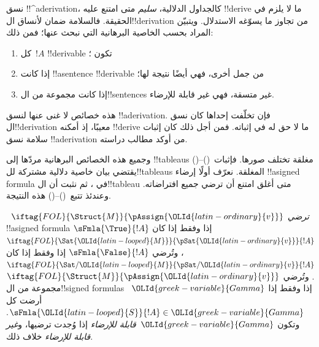 \documentclass[../../../include/open-logic-section]{subfiles}
\begin{document}
      {}
      {}
      

\begin{explain}
نسق !!^a{derivation}، كالجداول الدلالية، \emph{سليم} متى امتنع عليه
!!{derive} ما لا يلزم في الحقيقة. فالسلامة ضمان لأنساق ال!!{derivation}
من تجاوز ما يسوّغه الاستدلال. ويتبيّن المراد بحسب الخاصية البرهانية
التي نبحث عنها؛ فمن ذلك:
\begin{enumerate}
\item كل~$!A$ !!{derivable} تكون ؛
\item إذا كانت !!a{sentence} !!{derivable} من جمل أخرى، فهي أيضًا نتيجة لها؛
\item إذا كانت مجموعة من ال!!{sentence}s غير متسقة، فهي غير قابلة للإرضاء.
\end{enumerate}
هذه خصائص لا غنى عنها لنسق !!a{derivation}. فإن تخلّفت إحداها
كان نسق ال!!{derivation} معيبًا، إذ أمكنه !!{derive} ما لا حق له
في إثباته. فمن أجل ذلك كان إثبات سلامة نسق !!a{derivation}
من أوكد مطالب دراسته.

وجميع هذه الخصائص البرهانية مردّها إلى !!{tableau}s مغلقة
تختلف صورها. فإثبات~()--() يقتضي بيان خاصية دلالية مشتركة
لل!!{tableau}s المغلقة. نعرّف أولًا إرضاء
!!a{signed formula} في ، ثم نثبت أن
ال!!{tableau} متى أغلق امتنع أن ترضي 
جميع افتراضاته. وعندئذ تتبع~()--() هذه النتيجة.
\end{explain}

\begin{defn}
~$\iftag{FOL}{\Struct{M}}{\pAssign{{\OLId{latin-ordinary}{v}}}}$
\emph{ترضي}
!!a{signed formula} $\sFmla{\True}{!A}$ إذا وفقط إذا كان
$\iftag{FOL}{\Sat{{\OLId{latin-looped}{M}}}}{\pSat{{\OLId{latin-ordinary}{v}}}}{!A}$، وتُرضي
$\sFmla{\False}{!A}$ إذا وفقط إذا كان
$\iftag{FOL}{\Sat/{{\OLId{latin-looped}{M}}}}{\pSat/{{\OLId{latin-ordinary}{v}}}}{!A}$. وتُرضي
$\iftag{FOL}{\Struct{M}}{\pAssign{{\OLId{latin-ordinary}{v}}}}$ مجموعة من ال!!{signed formula}s
~${\OLId{greek-variable}{Gamma}}$ إذا وفقط إذا أرضت كل $\sFmla{{\OLId{latin-looped}{S}}}{!A} \in {\OLId{greek-variable}{Gamma}}$. وتكون
${\OLId{greek-variable}{Gamma}}$~\emph{قابلة للإرضاء} إذا وُجدت
 ترضيها، و\emph{غير قابلة
للإرضاء} خلاف ذلك.
\end{defn}
\end{document}
